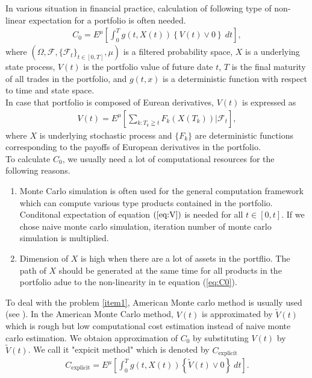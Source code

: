 \documentclass[12pt]{article}
\begin{document}
In various situation in financial practice, calculation of following type of non-linear expectation for a portfolio is often needed.
\begin{align}\label{eq:C0}
    C_0 = E^{\mu}\left[\int_{0}^T g(t, X(t))\left\{V(t) \vee0 \right \} \ dt \right],
\end{align}
where $(\Omega, \mathcal{F}, \{\mathcal{F}_t\}_{t\in [0,T]}, \mu)$ is a filtered probability space, $X$ is a underlying state process, $V(t)$ is the portfolio value of future date $t$, $T$ is the final maturity
of all trades in the portfolio, and $g(t, x)$ is a deterministic function with respect to time and state space.\\
In case that portfolio is composed of Eurean derivatives, $V(t)$ is expressed as
\begin{align}\label{eq:V}
  V(t) =  E^{\mu} \left[ \sum_{k:T_k\geqq t}F_k\left({X}(T_k)\right) |\mathcal{F}_t \right],
\end{align}
where $X$ is underlying stochastic process and $\{F_k\}$ are deterministic functions corresponding to the payoffs of European derivatives in the portfolio.\\
To calculate $C_0$, we usually need a lot of computational resources for the following reasons.
\begin{enumerate}
    \item \label{item1} Monte Carlo simulation is often used for the general computation 
        framework which can compute various type products contained in the portfolio. 
        Conditonal expectation of equation $(\ref{eq:V})$ is needed for all $t \in [0, t]$.
        If we chose naive monte carlo simulation, iteration number of monte carlo 
        simulation is multiplied.
    \item \label{item2} 
        Dimension of $X$ is high when there are a lot of assets in the portflio. 
        The path of $X$ should be generated at the same time for all products in 
        the portfolio adue to the non-linearity in te equation (\ref{eq:C0}).
\end{enumerate}
To deal with the problem \ref{item1}, American Monte carlo method is usually used (see \cite{G}).
In the American Monte Carlo method, $V(t)$ is approximated by $\tilde{V}(t)$ which is rough but low computational cost estimation instead of naive monte carlo estimation.
We obtaion approximation of $C_0$ by substituting $V(t)$ by $\tilde{V}(t)$.
We call it "expicit method" which is denoted by $C_{\text{explicit}}$
\begin{align}
    C_{\text{explicit}}=E^{\mu}\left[\int_{0}^T g(t, X(t))\left\{\tilde{V}(t) \vee0 \right \} \ dt \right].
\end{align}
\end{document}
